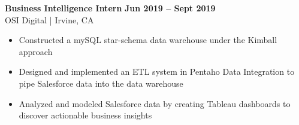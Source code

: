 \textbf{Business Intelligence Intern} \hfill \textbf{Jun 2019 -- Sept 2019} \\
OSI Digital | Irvine, CA
    \squish
    \begin{itemize}
    \setlength\itemsep{-2pt}
        \item Constructed a mySQL star-schema data warehouse under the Kimball approach
        \item Designed and implemented an ETL system in Pentaho Data Integration to pipe Salesforce data into the data warehouse
        \item Analyzed and modeled Salesforce data by creating Tableau dashboards to discover actionable business insights
    \end{itemize}